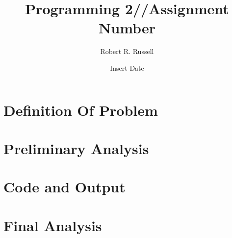 \documentclass[letterpaper,oneside]{scrartcl}
\title{Programming 2//Assignment Number}
\author{Robert R. Russell}
\date{Insert Date}
\begin{document}
\maketitle

\section{Definition Of Problem}

\section{Preliminary Analysis}

\section{Code and Output}

\section{Final Analysis}
\end{document}
